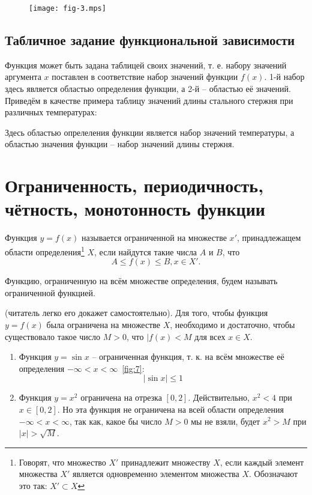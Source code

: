 \begin{figure}
	\texttt{[image: fig-3.mps]}
	\caption{}
	\label{fig:3}
\end{figure}

\subsection{Табличное задание функциональной зависимости}
Функция может быть задана таблицей своих значений, т. е. набору значений
аргумента $x$ поставлен в соответствие набор значений функции $f(x)$. 1-й
набор здесь является областью определения функции, а 2-й -- областью её
значений. Приведём в качестве примера таблицу значений длины стального стержня
при различных температурах:


Здесь областью опрелеления функции является набор значений температуры, а
областью значения функции -- набор значений длины стержня.

\section{Ограниченность, периодичность, чётность, монотонность функции}
\begin{definition}
	Функция $y = f(x)$ называется ограниченной на множестве $x'$,
	принадлежащем области определения\footnote{Говорят, что множество $X'$
	принадлежит множеству $X$, если каждый элемент множества $X'$ является
	одновременно элементом множества $X$. Обозначают это так: $X' \subset
	X$} $X$, если найдутся такие числа $A$ и $B$, что
	$$A \leq f(x) \leq B, x \in X'.$$
\end{definition}

Функцию, ограниченную на всём множестве определения, будем называть
ограниченной функцией.

\begin{corollary}
	(читатель легко его докажет самостоятельно). Для того, чтобы функция $y
	= f(x)$ была ограничена на множестве $X$, необходимо и достаточно,
	чтобы существовало такое число $M > 0$, что $|f(x) < M$ для всех $x
	\in X$.
\end{corollary}

\begin{example}
	\begin{enumerate}
		\item Функция $y = \sin{x}$ -- ограниченная функция, т. к. на
			всём множестве её определения $-\infty < x <
			\infty$~\ref{fig:7}:
		$$ |\sin{x}| \leq 1$$
	\item Функция $y = x^2$ ограничена на отрезка $[0,2]$. Действительно,
		$x^2 < 4$ при $x\in [0,2]$. Но эта функция не ограничена на
		всей области определения $-\infty < x < \infty$, так как,
		какое бы число $M > 0$ мы не взяли, будет $x^2 > M$ при $|x| >
		\sqrt{M}$.
	\end{enumerate}
\end{example}

